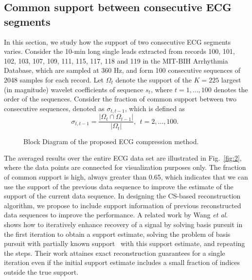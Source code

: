 \documentclass[journal]{IEEEtran}
\begin{document}
\subsection{Common support between consecutive ECG segments}
\label{ssec:CSPKSS}
In this section, we study how the support of two consecutive ECG segments varies. Consider the 10-min long single leads extracted from records 100, 101, 102, 103, 107, 109, 111, 115, 117, 118 and 119 in the MIT-BIH Arrhythmia Database, which are sampled at 360 Hz, and form 100 consecutive sequences of $2048$ samples for each record. Let $\Omega_t$  denote the support of the $K=225$ largest (in magnitude) wavelet coefficients of sequence $s_t$, where $t=1,\ldots,100$ denotes the order of the sequences. Consider the fraction of common support between two consecutive sequences, denoted as $\sigma_{t,t-1}$, which is defined as
\begin{equation}\label{LIP100}
\sigma_{t,t-1}=\frac{|\Omega_t\cap \Omega_{t-1}|}{|\Omega_t|}, ~~t=2, \ldots, 100.~~
\end{equation}

\begin{figure*}[t]
\caption{Block Diagram of the proposed ECG compression method.} \label{fig:3}
\end{figure*}

The averaged results over the entire ECG data set are illustrated in Fig.~\ref{fig:2}, where the data points are connected for visualization purposes only. The fraction of common support is high, always greater than 0.65, which indicates that we can use the support of the previous data sequence to improve the estimate of the support of the current data sequence. In designing the CS-based reconstruction algorithm, we propose to include support information of previous reconstructed data sequences to improve the performance. A related work by Wang \textit{et al.}~\cite{Wang10} shows how to iteratively enhance recovery of a signal by solving basis pursuit in the first iteration to obtain a support estimate, solving the problem of basis pursuit with partially known support~\cite{Vasw09} with this support estimate, and repeating the steps. Their work attaines exact reconstruction guarantees for a single iteration even if the initial support estimate includes a small fraction of indices outside the true support.
\end{document}
